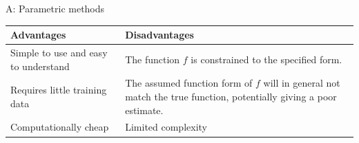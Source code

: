 \documentclass[ignorenonframetext,]{beamer}
\begin{document}
\begin{frame}

\begin{block}{A: Parametric methods}

\begin{longtable}[]{@{}ll@{}}
\toprule
\begin{minipage}[b]{0.47\columnwidth}\raggedright\strut
Advantages\strut
\end{minipage} & \begin{minipage}[b]{0.47\columnwidth}\raggedright\strut
Disadvantages\strut
\end{minipage}\tabularnewline
\midrule
\endhead
\begin{minipage}[t]{0.47\columnwidth}\raggedright\strut
Simple to use and easy to understand\strut
\end{minipage} & \begin{minipage}[t]{0.47\columnwidth}\raggedright\strut
The function \(f\) is constrained to the specified form.\strut
\end{minipage}\tabularnewline
\begin{minipage}[t]{0.47\columnwidth}\raggedright\strut
Requires little training data\strut
\end{minipage} & \begin{minipage}[t]{0.47\columnwidth}\raggedright\strut
The assumed function form of \(f\) will in general not match the true
function, potentially giving a poor estimate.\strut
\end{minipage}\tabularnewline
\begin{minipage}[t]{0.47\columnwidth}\raggedright\strut
Computationally cheap\strut
\end{minipage} & \begin{minipage}[t]{0.47\columnwidth}\raggedright\strut
Limited complexity\strut
\end{minipage}\tabularnewline
\bottomrule
\end{longtable}

\end{block}

\end{frame}
\end{document}
